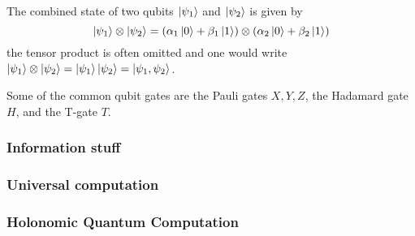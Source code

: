 The combined state of two qubits $\ket{\psi_1}$ and $\ket{\psi_2}$ is given by 
\begin{equation}
\ket{\psi_1} \otimes \ket{\psi_2} = (\alpha_1\ket{0} + \beta_1\ket{1})\otimes(\alpha_2\ket{0} + \beta_2\ket{1})
\end{equation}
the tensor product is often omitted and one would write $\ket{\psi_1} \otimes \ket{\psi_2} = \ket{\psi_1}\ket{\psi_2} = \ket{\psi_1, \psi_2}$.

Some of the common qubit gates are the Pauli gates $X,Y,Z$, the Hadamard gate $H$, and the T-gate $T$.





\subsubsection{Information stuff}

\subsubsection{Universal computation}

\subsubsection{Holonomic Quantum Computation}

